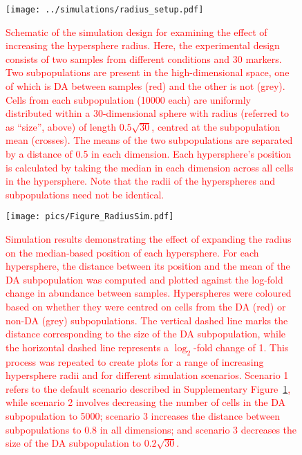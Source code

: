 \documentclass{article}
\newcommand\revised[1]{\textcolor{red}{#1}}
\begin{document}
\begin{figure}[tbp]
    \begin{center}
        \texttt{[image: ../simulations/radius\_setup.pdf]}
    \end{center}
    \caption{\revised{Schematic of the simulation design for examining the effect of increasing the hypersphere radius.
        Here, the experimental design consists of two samples from different conditions and 30 markers.
        Two subpopulations are present in the high-dimensional space, one of which is DA between samples (red) and the other is not (grey).
        Cells from each subpopulation (10000 each) are uniformly distributed within a 30-dimensional sphere with radius (referred to as ``size'', above) of length $0.5\sqrt{30}$, centred at the subpopulation mean (crosses).
        The means of the two subpopulations are separated by a distance of 0.5 in each dimension.
        Each hypersphere's position is calculated by taking the median in each dimension across all cells in the hypersphere.
        Note that the radii of the hyperspheres and subpopulations need not be identical.
    }
    }
    \label{fig:radius_schematic}
\end{figure}

\begin{figure}[tbp]
    \begin{center}
        \texttt{[image: pics/Figure\_RadiusSim.pdf]}
    \end{center}
    \caption{\revised{Simulation results demonstrating the effect of expanding the radius on the median-based position of each hypersphere.
        For each hypersphere, the distance between its position and the mean of the DA subpopulation was computed and plotted against the log-fold change in abundance between samples.
        Hyperspheres were coloured based on whether they were centred on cells from the DA (red) or non-DA (grey) subpopulations.
        The vertical dashed line marks the distance corresponding to the size of the DA subpopulation, while the horizontal dashed line represents a $\log_2$-fold change of 1.
        This process was repeated to create plots for a range of increasing hypersphere radii and for different simulation scenarios.
        Scenario 1 refers to the default scenario described in Supplementary Figure~\ref{fig:radius_schematic}, while scenario 2 involves decreasing the number of cells in the DA subpopulation to 5000; scenario 3 increases the distance between subpopulations to 0.8 in all dimensions; and scenario 3 decreases the size of the DA subpopulation to $0.2\sqrt{30}$.
    }
    }
    \label{fig:radius_position}
\end{figure}
\end{document}
